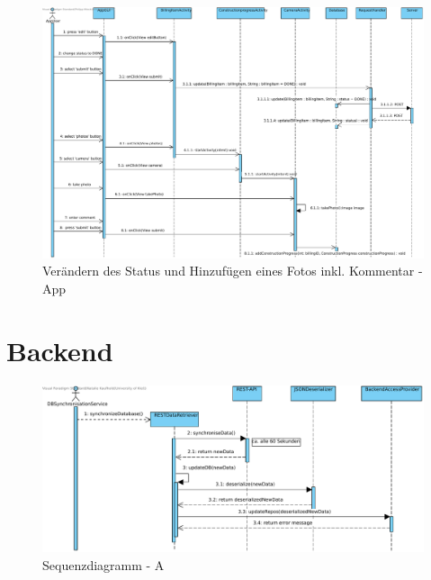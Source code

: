 \begin{figure}[H]
	\centering
	\includegraphics[width=\linewidth]{img/diagrams/change status, take photo.pdf}		
	\caption{Verändern des Status und Hinzufügen eines Fotos inkl. Kommentar - App}
	\label{fig:sequenzdiagramm-app}
\end{figure}



\section{Backend}

\begin{figure}[h]
	\centering
	\includegraphics[width=16cm]{img/diagrams/RESThandling.pdf}	
	\caption{Sequenzdiagramm - A}
	\label{fig:sequenz-a}
\end{figure}

